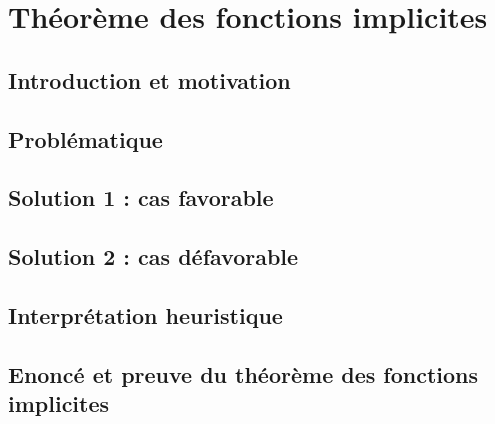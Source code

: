 \chapter{Théorème des fonctions implicites}

\section{Introduction et motivation}


\section*{Problématique}

\section*{Solution 1 : cas favorable}

\section*{Solution 2 : cas défavorable}

\section*{Interprétation heuristique}


\section{Enoncé et preuve du théorème des fonctions implicites}


